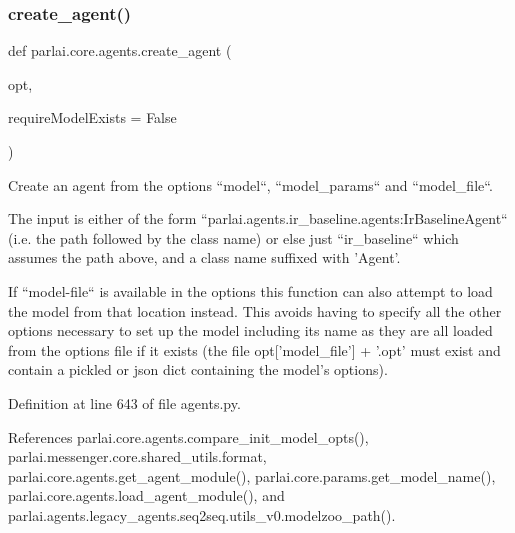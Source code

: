 \subsubsection{\texorpdfstring{create\+\_\+agent()}{create\_agent()}}
{\footnotesize\ttfamily def parlai.\+core.\+agents.\+create\+\_\+agent (\begin{DoxyParamCaption}\item[{}]{opt,  }\item[{}]{require\+Model\+Exists = {\ttfamily False} }\end{DoxyParamCaption})}

\begin{DoxyVerb}Create an agent from the options ``model``, ``model_params`` and ``model_file``.

The input is either of the form
``parlai.agents.ir_baseline.agents:IrBaselineAgent`` (i.e. the path
followed by the class name) or else just ``ir_baseline`` which
assumes the path above, and a class name suffixed with 'Agent'.

If ``model-file`` is available in the options this function can also
attempt to load the model from that location instead. This avoids having to
specify all the other options necessary to set up the model including its
name as they are all loaded from the options file if it exists (the file
opt['model_file'] + '.opt' must exist and contain a pickled or json dict
containing the model's options).
\end{DoxyVerb}
 

Definition at line 643 of file agents.\+py.



References parlai.\+core.\+agents.\+compare\+\_\+init\+\_\+model\+\_\+opts(), parlai.\+messenger.\+core.\+shared\+\_\+utils.\+format, parlai.\+core.\+agents.\+get\+\_\+agent\+\_\+module(), parlai.\+core.\+params.\+get\+\_\+model\+\_\+name(), parlai.\+core.\+agents.\+load\+\_\+agent\+\_\+module(), and parlai.\+agents.\+legacy\+\_\+agents.\+seq2seq.\+utils\+\_\+v0.\+modelzoo\+\_\+path().



